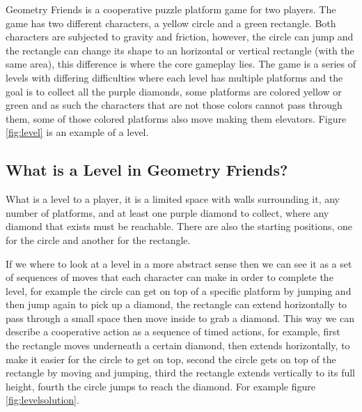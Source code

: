 \documentclass[runningheads]{llncs}
\begin{document}
Geometry Friends is a cooperative puzzle platform game for two players. The game has two different characters, a yellow circle and a green rectangle. Both characters are subjected to gravity and friction, however, the circle can jump and the rectangle can change its shape to an horizontal or vertical rectangle (with the same area), this difference is where the core gameplay lies. The game is a series of levels with differing difficulties where each level has multiple platforms and the goal is to collect all the purple diamonds, some platforms are colored yellow or green and as such the characters that are not those colors cannot pass through them, some of those colored platforms also move making them elevators. Figure \ref{fig:level} is an example of a level.



\subsection{What is a Level in Geometry Friends?}

What is a level to a player, it is a limited space with walls surrounding it, any number of platforms, and at least one purple diamond to collect, where any diamond that exists must be reachable. There are also the starting positions, one for the circle and another for the rectangle.

If we where to look at a level in a more abstract sense then we can see it as a set of sequences of moves that each character can make in order to complete the level, for example the circle can get on top of a specific platform by jumping and then jump again to pick up a diamond, the rectangle can extend horizontally to pass through a small space then move inside to grab a diamond. This way we can describe a cooperative action as a sequence of timed actions, for example, first the rectangle moves underneath a certain diamond, then extends horizontally, to make it easier for the circle to get on top, second the circle gets on top of the rectangle by moving and jumping, third the rectangle extends vertically to its full height, fourth the circle jumps to reach the diamond. For example figure \ref{fig:levelsolution}. 
\end{document}
